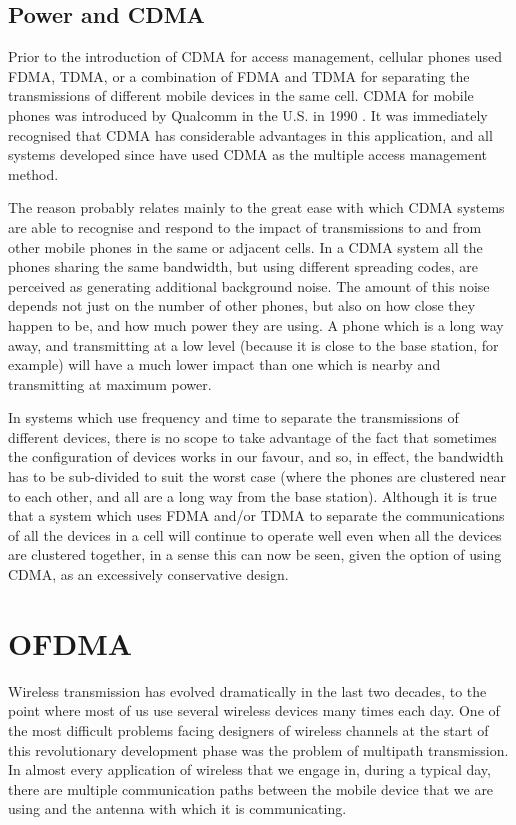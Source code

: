 \subsection{Power and CDMA}
Prior to the introduction of CDMA for access management, cellular
phones used FDMA, TDMA, or a combination of FDMA and TDMA for
separating the transmissions of different mobile devices in the same
cell. CDMA for mobile phones was introduced by Qualcomm in the U.S. in
1990 \cite{qualcommwiki}. It was immediately recognised that CDMA has
considerable advantages in this application, and all systems developed
since have used CDMA as the multiple access management method.

The reason probably relates mainly to the great ease with which CDMA
systems are able to recognise and respond to the impact of transmissions
to and from other mobile phones in the same or adjacent cells. In a CDMA
system all the phones sharing the same bandwidth, but using different
spreading codes, are perceived as generating additional background noise.
The amount of this noise depends not just on the number of other phones,
but also on how close they happen to be, and how much power they are
using. A phone which is a long way away, and transmitting at a low level
(because it is close to the base station, for example) will have a much
lower impact than one which is nearby and transmitting at maximum power.

In systems which use frequency and time to separate the transmissions
of different devices, there is no scope to take advantage of the fact
that sometimes the configuration of devices works in our favour, and so,
in effect, the bandwidth has to be sub-divided to suit the worst case
(where the phones are clustered near to each other, and all are a long
way from the base station). Although it is true that a system which
uses FDMA and/or TDMA to separate the communications of all the devices
in a cell will continue to operate well even when all the devices are
clustered together, in a sense this can now be seen, given the option
of using CDMA, as an excessively conservative design.


\section{OFDMA}

Wireless transmission has evolved dramatically in the last two decades, to the point where
most of us use several wireless devices many times each day. One of the most difficult
problems facing designers of wireless channels at the start of this revolutionary development
phase was the problem of multipath transmission. In almost every application of wireless
that we engage in, during a typical day, there are multiple communication paths between the
mobile device that we are using and the antenna with which it is communicating.

